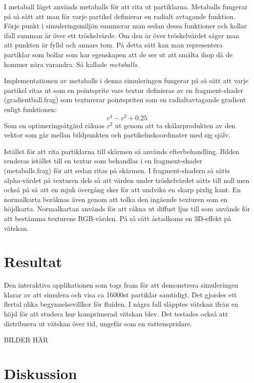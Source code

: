 \documentclass[a4paper,12pt,oneside,final]{extarticle}
\begin{document}
I metaball läget används metaballs för att rita ut partiklarna.
Metaballs fungerar på så sätt att man för varje partikel definierar en radialt avtagande funktion.
Förje punkt i simuleringsmiljön summerar man sedan dessa funktioner och kollar ifall summan är över ett tröskelvärde.
Om den är över tröskelvärdet säger man att punkten är fylld och annars tom.
På detta sätt kan man representera partiklar som bollar som har egenskapen att de ser ut att smälta ihop då de kommer nära varandra.
Så kallade \textit{metaballs}.

Implementationen av metaballs i denna simuleringen fungerar på så sätt att varje partikel ritas ut som en pointsprite vars textur definieras av en fragment-shader (gradientball.frag) som texturerar pointspriten som en radialtavtagande gradient enligt funktionen:
\begin{equation}
r^{4} -r^{2} + 0.25
\end{equation}
Som en optimeringsåtgärd räknas $ r^{2} $ ut genom att ta skälarprodukten av den vektor som går mellan bildpunkten och partikelnskoordinater med sig själv.

Istället för att rita partiklarna till skärmen så används efterbehandling.
Bilden renderas istället till en textur som behandlas i en fragment-shader (metaballs.frag) för att sedan ritas på skärmen.
I fragment-shadern så sätts alpha-värdet på texturen dels så att värden under tröskelvärdet sätts till noll men också på så att en mjuk övergång sker för att undvika en skarp pixlig kant.
En normalkarta beräknas även genom att tolka den ingående texturen som en höjdkarta.
Normalkartan används för att räkna ut diffust ljus till som används för att bestämma texturens RGB-värden.
På så sätt åstadkoms en 3D-effekt på vätskan.
\clearpage

\section{Resultat}
Den interaktiva applikationen som togs fram för att demonstrera simuleringen klarar av att simulera och visa ca 16000st partiklar samtidigt.
Det gjordes ett flertal olika begynnelsevillkor för fluiden.
I några fall släpptes vätskan ifrån en höjd för att studera hur komprimerad vätskan blev.
Det testades också att distribuera ut vätskan över tid, ungefär som en vattenspridare.

BILDER HÄR

\section{Diskussion}
\end{document}
